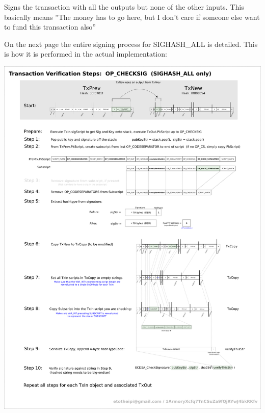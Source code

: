 Signs the transaction with all the outputs but none of the other inputs. This basically means ''The money has to go here, but I don't care if someone else want to fund this transaction also''

On the next page the entire signing process for SIGHASH\_ALL is detailed. This is how it is performed in the actual implementation:
\newpage
\centerline{\includegraphics[width=1.35\textwidth]{background/images/checksig_in_detail.png}}
\newpage




